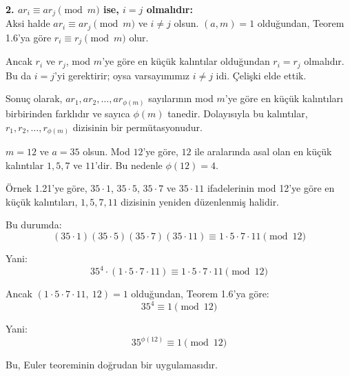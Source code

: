 \begin{tcolorbox}[colback=green!5, colframe=green!40!black, title=\textbf{Lemma 1.6: Permütasyon Özelliği}, fonttitle=\bfseries, sharp corners]
\textbf{2. $ar_i \equiv ar_j \pmod{m}$ ise, $i = j$ olmalıdır:} \\
Aksi halde $ar_i \equiv ar_j \pmod{m}$ ve $i \ne j$ olsun. $(a, m) = 1$ olduğundan, Teorem 1.6'ya göre $r_i \equiv r_j \pmod{m}$ olur. 

Ancak $r_i$ ve $r_j$, mod $m$'ye göre en küçük kalıntılar olduğundan $r_i = r_j$ olmalıdır. Bu da $i = j$'yi gerektirir; oysa varsayımımız $i \ne j$ idi. Çelişki elde ettik.

\vspace{0.5em}

Sonuç olarak, $ar_1, ar_2, \ldots, ar_{\phi(m)}$ sayılarının mod $m$'ye göre en küçük kalıntıları birbirinden farklıdır ve sayıca $\phi(m)$ tanedir. Dolayısıyla bu kalıntılar, $r_1, r_2, \ldots, r_{\phi(m)}$ dizisinin bir permütasyonudur.
\end{tcolorbox}

\vspace{2em}

\begin{tcolorbox}[colback=gray!5, colframe=black, title=\textbf{Örnek 1.23: Euler Teoremi Uygulaması}, fonttitle=\bfseries, sharp corners]
$m = 12$ ve $a = 35$ olsun. Mod $12$'ye göre, $12$ ile aralarında asal olan en küçük kalıntılar $1, 5, 7$ ve $11$'dir. Bu nedenle $\phi(12) = 4$.

Örnek 1.21'ye göre, $35 \cdot 1$, $35 \cdot 5$, $35 \cdot 7$ ve $35 \cdot 11$ ifadelerinin mod 12'ye göre en küçük kalıntıları, $1, 5, 7, 11$ dizisinin yeniden düzenlenmiş halidir.

Bu durumda:
\[
(35 \cdot 1)(35 \cdot 5)(35 \cdot 7)(35 \cdot 11) \equiv 1 \cdot 5 \cdot 7 \cdot 11 \pmod{12}
\]

Yani:
\[
35^4 \cdot (1 \cdot 5 \cdot 7 \cdot 11) \equiv 1 \cdot 5 \cdot 7 \cdot 11 \pmod{12}
\]

Ancak $(1 \cdot 5 \cdot 7 \cdot 11,\ 12) = 1$ olduğundan, Teorem 1.6'ya göre:
\[
35^4 \equiv 1 \pmod{12}
\]

Yani:
\[
35^{\phi(12)} \equiv 1 \pmod{12}
\]

Bu, Euler teoreminin doğrudan bir uygulamasıdır.
\end{tcolorbox}

\vspace{2em}

